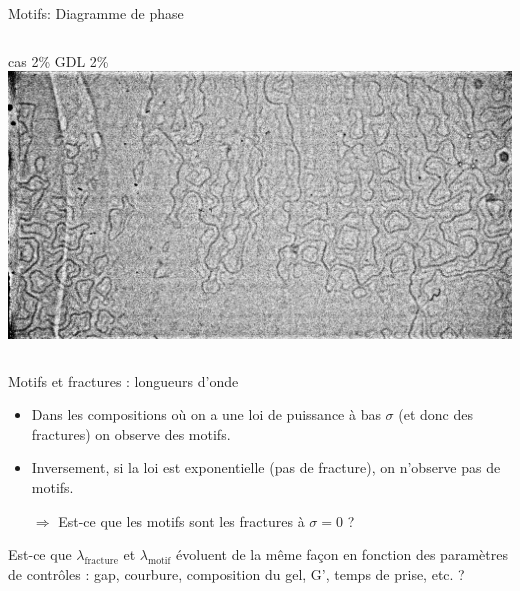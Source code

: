 \documentclass{beamer}
\begin{document}
\begin{frame}{Motifs: Diagramme de phase}
\begin{columns}
cas 2\% GDL 2\%\\
\includegraphics[width=\textwidth]{motif_cas3_GDL2_zoom1.jpg}
\end{columns}

\end{frame}

\begin{frame}{Motifs et fractures : longueurs d'onde}
\begin{itemize}
\item Dans les compositions où on a une loi de puissance à bas $\sigma$ (et donc des fractures) on observe des motifs. 
\item Inversement, si la loi est exponentielle (pas de fracture), on n'observe pas de motifs. 
\item[$\Rightarrow$] Est-ce que les motifs sont les fractures à $\sigma=0$ ?
\end{itemize}

Est-ce que $\lambda_\text{fracture}$ et $\lambda_\text{motif}$ évoluent de la même façon en fonction des paramètres de contrôles : gap, courbure, composition du gel, G', temps de prise, etc. ?
\end{frame}
\end{document}
